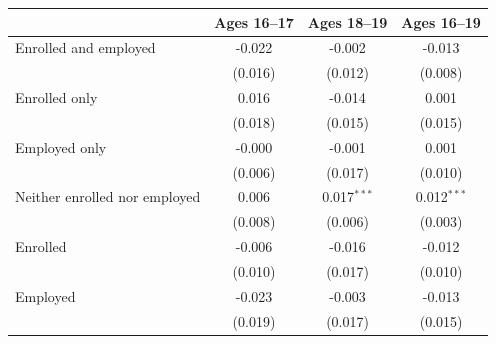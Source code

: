 \begin{tabular}{lccc}
\toprule
 & Ages 16--17 & Ages 18--19 & Ages 16--19 \\
\midrule
Enrolled and employed & -0.022 & -0.002 & -0.013 \\
 & (0.016) & (0.012) & (0.008) \\
Enrolled only & 0.016 & -0.014 & 0.001 \\
 & (0.018) & (0.015) & (0.015) \\
Employed only & -0.000 & -0.001 & 0.001 \\
 & (0.006) & (0.017) & (0.010) \\
Neither enrolled nor employed & 0.006 & 0.017$^{***}$ & 0.012$^{***}$ \\
 & (0.008) & (0.006) & (0.003) \\
Enrolled & -0.006 & -0.016 & -0.012 \\
 & (0.010) & (0.017) & (0.010) \\
Employed & -0.023 & -0.003 & -0.013 \\
 & (0.019) & (0.017) & (0.015) \\
\bottomrule
\end{tabular}
